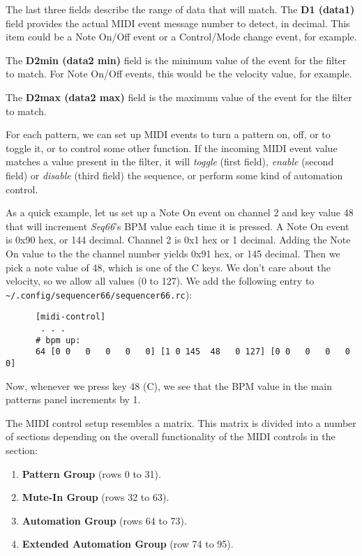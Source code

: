    The last three fields describe the range of data that will match.  The
   \textbf{D1 (data1)} field provides the actual MIDI event message number to
   detect, in decimal.  This item could be a Note On/Off event or a
   Control/Mode change event, for example.

   The \textbf{D2min (data2 min)} field is the minimum value of the event for
   the filter to match. For Note On/Off events, this would be the velocity
   value, for example.

   The \textbf{D2max (data2 max)} field is the maximum value of the event for
   the filter to match.


   For each pattern, we can set up MIDI events to turn a 
   pattern on, off, or to toggle it, or to control some other function.
   If the incoming MIDI event value matches a value present in the filter, it
   will \textsl{toggle} (first field), \textsl{enable} (second field) or
   \textsl{disable} (third field) the sequence, or perform some kind of automation
   control.

   As a quick example, let us set up a Note On event on channel 2 and key value
   48 that will increment \textsl{Seq66}'s BPM value each time it is
   pressed.  A Note On event is 0x90 hex, or 144 decimal.  Channel 2 is 0x1 hex
   or 1 decimal.   Adding the Note On value to the the channel number yields
   0x91 hex, or 145 decimal.  Then we pick a note value of 48, which is one of
   the C keys.  We don't care about the velocity, so we allow all values (0 to
   127).  We add the following entry to
   \texttt{\textasciitilde/.config/sequencer66/sequencer66.rc}):

   \begin{verbatim}
      [midi-control]
       . . .
      # bpm up:
      64 [0 0   0   0   0   0] [1 0 145  48   0 127] [0 0   0   0   0   0]
   \end{verbatim}

   Now, whenever we press key 48 (C), we see that the BPM value in the main
   patterns panel increments by 1.

   The MIDI control setup resembles a matrix.  This matrix is divided into a
   number of sections depending on the overall functionality of the MIDI
   controls in the section:

   \begin{enumerate}
      \item \textbf{Pattern Group} (rows 0 to 31).
      \item \textbf{Mute-In Group} (rows 32 to 63).
      \item \textbf{Automation Group} (rows 64 to 73).
      \item \textbf{Extended Automation Group} (row 74 to 95).
   \end{enumerate}

